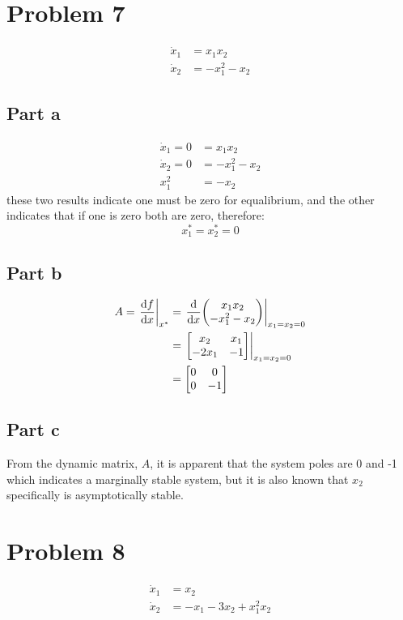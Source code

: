 \documentclass[]{article}
\begin{document}
\section{Problem 7}

\begin{align*}
	\dot{x}_1 &= x_1 x_2\\
	\dot{x}_2 &= -x_1^2 -x_2
\end{align*}

\subsection{Part a}
\begin{align*}
	\dot{x}_1 = 0 &= x_1 x_2\\
	\dot{x}_2 = 0 &= -x_1^2 -x_2\\
	x_1^2 &= -x_2
\end{align*}
these two results indicate one must be zero for equalibrium, and the other indicates that if one is zero both are zero, therefore:
\begin{displaymath}
	x_1^* = x_2^* = 0
\end{displaymath}

\subsection{Part b}

\begin{align*}
	A = \eval{\dv{f}{x}}_{x^*} &= \eval{\dv{x} \mqty(x_1 x_2\\ -x_1^2 -x_2)}_{x_1=x_2=0}\\
	&= \eval{\mqty[x_2 & x_1\\ -2 x_1 & -1]}_{x_1=x_2=0}\\
	&= \mqty[0&0\\0 &-1]
\end{align*}


\subsection{Part c}
From the dynamic matrix, $A$, it is apparent that the system poles are 0 and -1 which indicates a marginally stable system, but it is also known that $x_2$ specifically is asymptotically stable.

\newpage
\section{Problem 8}
\begin{align*}
	\dot{x}_1 &= x_2\\
	\dot{x}_2 &= -x_1 - 3 x_2 + x_1^2 x_2
\end{align*}
\end{document}

